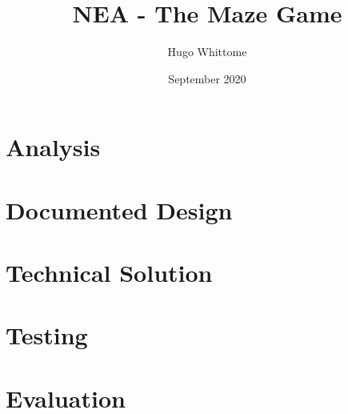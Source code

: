 \documentclass{article}
\title{NEA - The Maze Game}
\author{Hugo Whittome}
\date{September 2020}
\begin{document}
    \maketitle %
    \tableofcontents
    \clearpage
    \section{Analysis}
        
    \clearpage
    \section{Documented Design}
        
    \clearpage
    \section{Technical Solution}
      
    \clearpage
    \section{Testing}
      
    \clearpage
    \section{Evaluation}
      
\end{document}
